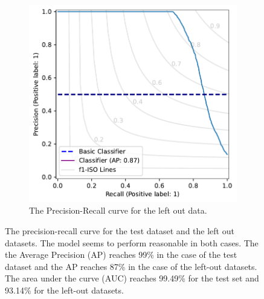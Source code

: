 \documentclass[a4paper, 12pt, oneside]{book} %
\begin{document}
\begin{figure} [h!]
\begin{subfigure}[b]{0.49\textwidth}
         \includegraphics[width=\textwidth]{precision_recall_plot_extern.pdf}
         \caption{The Precision-Recall curve for the left out data.}
         \label{fig:precision_recall_curve_test_external}
     \end{subfigure}
     \caption[Precision recall curves for test and left-out datasets]{The precision-recall curve for the test dataset and the left out datasets. The model seems to perform reasonable in both cases. The the Average Precision (AP) reaches 99\% in the case of the test dataset and the AP reaches 87\% in the case of the left-out datasets. The area under the curve (AUC) reaches 99.49\% for the test set and 93.14\% for the left-out datasets.}
     \label{fig:precision-recall}
\end{figure}
\end{document}
